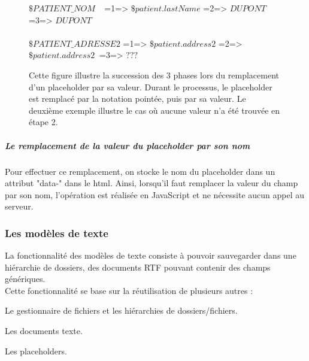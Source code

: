 
\begin{figure}[H]
	\color{darkgray} 
	\centering
$\$PATIENT\_NOM$ $~~$ =1=> $\$patient.lastName$ =2=> $DUPONT$ $~$ =3=> $DUPONT$ $~$\\ $~$\\
  $\$PATIENT\_ADRESSE2$  =1=> $\$patient.address2$ =2=> $\$patient.address2~$ =3=> $???$ 	
	\caption{\color{black} \label{fig:annotations} Cette figure illustre la succession des 3 phases lors du remplacement d'un placeholder par sa valeur. Durant le processus, le placeholder est remplacé par la notation pointée, puis par sa valeur. Le deuxième exemple illustre le cas où aucune valeur n'a été trouvée en étape 2.}
\end{figure}

\subparagraph*{Le remplacement de la valeur du placeholder par son nom}
Pour effectuer ce remplacement, on stocke le nom du placeholder dans un attribut "data-" dans le html. Ainsi, lorsqu'il faut remplacer la valeur du champ par son nom, l'opération est réalisée en JavaScript et ne nécessite aucun appel au serveur.




\subsubsection{Les modèles de texte}
La fonctionnalité des modèles de texte consiste à pouvoir sauvegarder dans une hiérarchie de dossiers, des documents RTF pouvant contenir des champs génériques.\\
Cette fonctionnalité se base sur la réutilisation de plusieurs autres :
\begin{sitemize}
\item Le gestionnaire de fichiers et les hiérarchies de dossiers/fichiers.
\item Les documents texte.
\item Les placeholders.
\end{sitemize}

